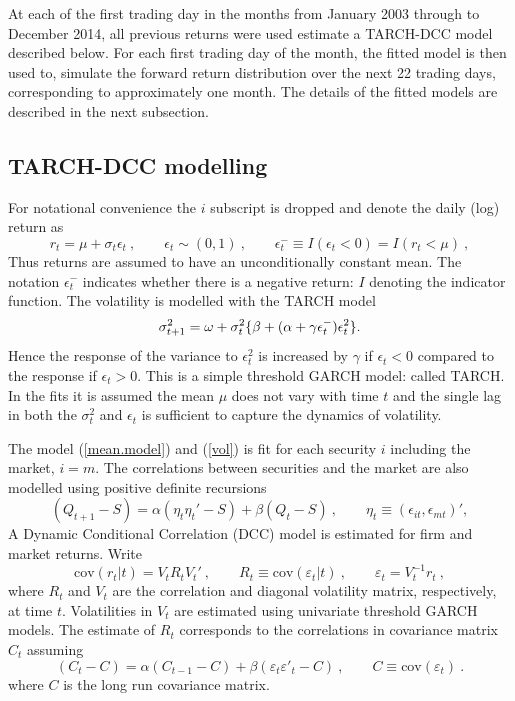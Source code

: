 \documentclass[authoryear]{elsarticle}
\newcommand{\cov}{\mathrm{cov}}
\newcommand{\eps}{\epsilon}
\newcommand{\eref}[1]{(\ref{#1})}
\newcommand{\cq}{\ , \qquad}
\newcommand{\be}[1]{\begin{equation}\label{#1}}
\newcommand{\ee}{\end{equation}}
\begin{document}
At each of the first trading day in the months from January 2003 through to December 2014,  all previous returns were used estimate a TARCH-DCC model described below.   For each first trading day of the month, the fitted model is then used to, simulate the forward return distribution over the next 22 trading days, corresponding to approximately one month.  The details of the fitted models are described in the next subsection.

\subsection{TARCH-DCC modelling}

For notational convenience the $i$ subscript is dropped and denote the daily (log) return as
\newcommand{\vareps}{\varepsilon}
\be{mean.model}
r_{t}=\mu+\sigma_t\eps_t\cq \eps_t\sim (0,1)\cq  \eps^-_t\equiv I(\eps_t<0)=I(r_t<\mu)\ ,
\ee
Thus returns are assumed to have an unconditionally constant mean.   The notation $\eps_t^-$ indicates whether there is a negative return:  $I$ denoting the indicator function.  The volatility is modelled with the TARCH model
\be{vol}
\sigma_{t+1}^2 = \omega+ \sigma^2_t\{\beta+(\alpha+\gamma \eps^-_t)\eps_{t}^2\}\\ .
\ee
Hence the response of the variance to $\eps_t^2$  is increased by $\gamma$   if $\eps_{t}<0$ compared to the response if $\eps_t>0$.  This is a simple threshold GARCH model:  called TARCH.   In the fits it is assumed the mean $\mu$ does not vary with time $t$ and the single lag in both the $\sigma_t^2$ and $\eps_t$ is sufficient to capture the dynamics of volatility. 

The model \eref{mean.model} and \eref{vol} is fit  for each security $i$ including the market,  $i=m$.   The correlations between securities and the market are also modelled using  positive definite recursions   \citep{engle2002dynamic}
$$
(Q_{t+1}-S) = \alpha (\eta_t\eta_t'-S) + \beta (Q_t-S)\cq \eta_t\equiv(\eps_{it},\eps_{mt})' ,
$$
A   Dynamic Conditional Correlation (DCC) model is estimated for  firm and market returns.  Write
\newcommand{\veps}{\varepsilon}
$$
\cov (r_t|t) = V_tR_tV_t'\cq R_t\equiv \cov(\veps_t|t)\cq \veps_t=V_t^{-1}r_t\ ,
$$
where $R_t$ and  $V_t$  are the correlation and diagonal volatility matrix, respectively, at time $t$.   Volatilities in $V_t$  are estimated using univariate threshold GARCH models.  The estimate of $R_t$ corresponds to the correlations in covariance matrix $C_t$ assuming
$$
(C_t - C) = \alpha (C_{t-1}-C)+\beta (\veps_t\veps'_t-C) \cq C\equiv\cov(\veps_t)\ .
$$
where $C$ is the long run covariance matrix.
\end{document}

